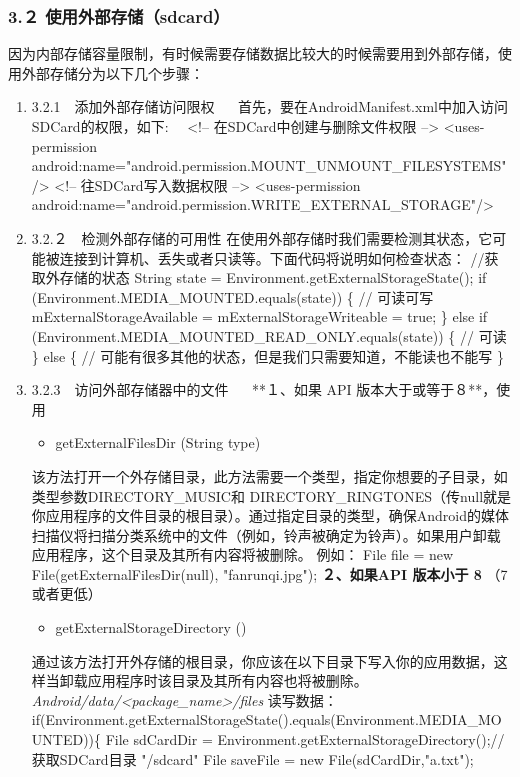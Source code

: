 \documentclass[9pt, b5paper]{article}
\begin{document}
\subsubsection{3.２ 使用外部存储（sdcard）}
\label{sec-7-0-4}
因为内部存储容量限制，有时候需要存储数据比较大的时候需要用到外部存储，使用外部存储分为以下几个步骤：
\begin{enumerate}
\item 3.2.1　添加外部存储访问限权
\label{sec-7-0-4-1}
　
首先，要在AndroidManifest.xml中加入访问SDCard的权限，如下:
　<!-- 在SDCard中创建与删除文件权限 --> 
    <uses-permission android:name="android.permission.MOUNT\_UNMOUNT\_FILESYSTEMS"/> 
   <!-- 往SDCard写入数据权限 --> 
    <uses-permission android:name="android.permission.WRITE\_EXTERNAL\_STORAGE"/>
\item 3.2.２　检测外部存储的可用性
\label{sec-7-0-4-2}
在使用外部存储时我们需要检测其状态，它可能被连接到计算机、丢失或者只读等。下面代码将说明如何检查状态：
//获取外存储的状态
String state = Environment.getExternalStorageState();
if (Environment.MEDIA\_MOUNTED.equals(state)) \{
    // 可读可写
    mExternalStorageAvailable = mExternalStorageWriteable = true;
\} else if (Environment.MEDIA\_MOUNTED\_READ\_ONLY.equals(state)) \{
    // 可读
\} else \{
    // 可能有很多其他的状态，但是我们只需要知道，不能读也不能写  
\}
\item 3.2.3　访问外部存储器中的文件
\label{sec-7-0-4-3}
　
**１、如果 API 版本大于或等于８**，使用
\begin{itemize}
\item getExternalFilesDir (String type)
\end{itemize}
该方法打开一个外存储目录，此方法需要一个类型，指定你想要的子目录，如类型参数DIRECTORY\_MUSIC和 DIRECTORY\_RINGTONES（传null就是你应用程序的文件目录的根目录）。通过指定目录的类型，确保Android的媒体扫描仪将扫描分类系统中的文件（例如，铃声被确定为铃声）。如果用户卸载应用程序，这个目录及其所有内容将被删除。
例如：
File file = new File(getExternalFilesDir(null), "fanrunqi.jpg");
\textbf{\textbf{２、如果API 版本小于 8}} （7或者更低）

\begin{itemize}
\item getExternalStorageDirectory ()
\end{itemize}
通过该方法打开外存储的根目录，你应该在以下目录下写入你的应用数据，这样当卸载应用程序时该目录及其所有内容也将被删除。
\emph{Android/data/<package\_name>/files}
读写数据：
if(Environment.getExternalStorageState().equals(Environment.MEDIA\_MOUNTED))\{  
            File sdCardDir = Environment.getExternalStorageDirectory();//获取SDCard目录  "/sdcard"        
               File saveFile = new File(sdCardDir,"a.txt"); 


\end{enumerate}
\end{document}
